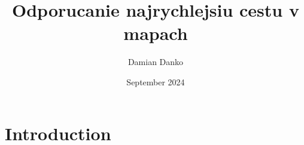 \documentclass{article}
\title{Odporucanie najrychlejsiu cestu v mapach}
\author{Damian Danko}
\date{September 2024}
\begin{document}
\maketitle

\section{Introduction}
\end{document}
